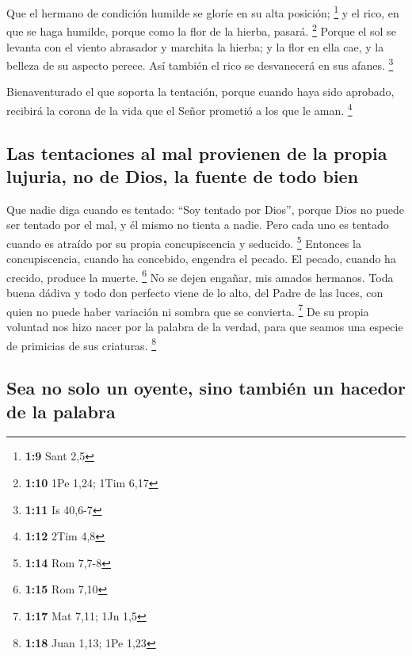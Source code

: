  Que el hermano de condición humilde se gloríe en su alta
posición; \footnote{\textbf{1:9} Sant 2,5}  y el rico, en
que se haga humilde, porque como la flor de la hierba, pasará.
\footnote{\textbf{1:10} 1Pe 1,24; 1Tim 6,17}  Porque el
sol se levanta con el viento abrasador y marchita la hierba; y la flor
en ella cae, y la belleza de su aspecto perece. Así también el rico se
desvanecerá en sus afanes. \footnote{\textbf{1:11} Is 40,6-7}

 Bienaventurado el que soporta la tentación, porque
cuando haya sido aprobado, recibirá la corona de la vida que el Señor
prometió a los que le aman. \footnote{\textbf{1:12} 2Tim 4,8}

\hypertarget{las-tentaciones-al-mal-provienen-de-la-propia-lujuria-no-de-dios-la-fuente-de-todo-bien}{%
\subsection{Las tentaciones al mal provienen de la propia lujuria, no de
Dios, la fuente de todo
bien}\label{las-tentaciones-al-mal-provienen-de-la-propia-lujuria-no-de-dios-la-fuente-de-todo-bien}}

 Que nadie diga cuando es tentado: ``Soy tentado por
Dios'', porque Dios no puede ser tentado por el mal, y él mismo no
tienta a nadie.  Pero cada uno es tentado cuando es
atraído por su propia concupiscencia y seducido. \footnote{\textbf{1:14}
  Rom 7,7-8}  Entonces la concupiscencia, cuando ha
concebido, engendra el pecado. El pecado, cuando ha crecido, produce la
muerte. \footnote{\textbf{1:15} Rom 7,10}  No se dejen
engañar, mis amados hermanos.  Toda buena dádiva y todo
don perfecto viene de lo alto, del Padre de las luces, con quien no
puede haber variación ni sombra que se convierta. \footnote{\textbf{1:17}
  Mat 7,11; 1Jn 1,5}  De su propia voluntad nos hizo
nacer por la palabra de la verdad, para que seamos una especie de
primicias de sus criaturas. \footnote{\textbf{1:18} Juan 1,13; 1Pe 1,23}

\hypertarget{sea-no-solo-un-oyente-sino-tambiuxe9n-un-hacedor-de-la-palabra}{%
\subsection{Sea no solo un oyente, sino también un hacedor de la
palabra}\label{sea-no-solo-un-oyente-sino-tambiuxe9n-un-hacedor-de-la-palabra}}

